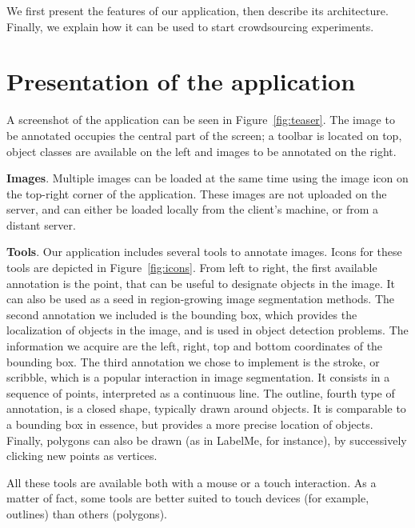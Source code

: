 We first present the features of our application, then describe its architecture.
Finally, we explain how it can be used to start crowdsourcing experiments.


\section{Presentation of the application}

A screenshot of the application can be seen in Figure~\ref{fig:teaser}.
The image to be annotated occupies the central part of the screen;
a toolbar is located on top, object classes are available on the left
and images to be annotated on the right.


\textbf{Images}.
Multiple images can be loaded at the same time using the image icon
on the top-right corner of the application.
These images are not uploaded on the server,
and can either be loaded locally from the client's machine,
or from a distant server.
% 
% 


\textbf{Tools}.
Our application includes several tools to annotate images.
Icons for these tools are depicted in Figure~\ref{fig:icons}.
From left to right, the first available annotation is the point,
that can be useful to designate objects in the image.
It can also be used as a seed in region-growing image segmentation methods.
The second annotation we included is the bounding box,
which provides the localization of objects in the image,
and is used in object detection problems.
The information we acquire are the left, right, top and bottom coordinates
of the bounding box.
The third annotation we chose to implement is the stroke,
or scribble, which is a popular interaction in image segmentation.
It consists in a sequence of points, interpreted as a continuous line.
The outline, fourth type of annotation,
is a closed shape, typically drawn around objects.
It is comparable to a bounding box in essence,
but provides a more precise location of objects.
Finally, polygons can also be drawn (as in LabelMe, for instance),
by successively clicking new points as vertices.


All these tools are available both with a mouse or a touch interaction.
As a matter of fact, some tools are better suited to touch devices
(for example, outlines) than others (polygons).

